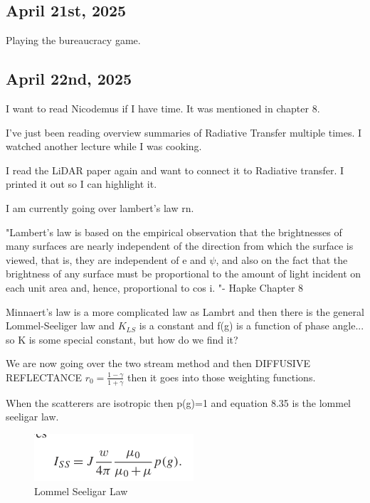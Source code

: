 \documentclass{article}
\begin{document}
\subsection{April 21st, 2025}
Playing the bureaucracy game. 


\subsection{April 22nd, 2025}
I want to read Nicodemus if I have time. It was mentioned in chapter 8. 

I've just been reading overview summaries of Radiative Transfer multiple times. I watched another lecture while I was cooking. 

I read the LiDAR paper again and want to connect it to Radiative transfer. I printed it out so I can highlight it. 

I am currently going over lambert's law rn. 

"Lambert’s law is based on the empirical observation that the brightnesses of many 
surfaces are nearly independent of the direction from which the surface is viewed, 
that is, they are independent of  e  and  $\psi$, and also on the fact that the brightness 
of any surface must be proportional to the amount of light incident on each unit 
area and, hence, proportional to cos  i. "- Hapke Chapter 8 

Minnaert's law is a more complicated law as Lambrt and then there is the general Lommel-Seeliger law and $K_{LS}$ is a constant and f(g) is a function of phase angle... so K is some special constant, but how do we find it?

We are now going over the two stream method and then DIFFUSIVE REFLECTANCE $r_0 = \frac{1- \gamma}{1+\gamma}$ then it goes into those weighting functions. 

When the scatterers are isotropic then p(g)=1 and equation 8.35 is the lommel seeligar law. 

\begin{figure}[h!]
\centering
\includegraphics[scale=.6]{Lommel.png}
\caption{Lommel Seeligar Law}
\label{fig:Lommel Seeligar Law}
\end{figure}

\end{document}

